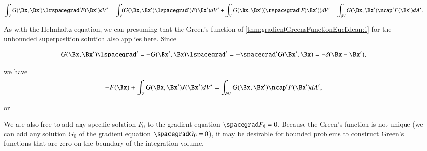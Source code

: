 \begin{dmath}\label{eqn:gradientGreensFunctionEuclidean:500}
\int_V G(\Bx, \Bx') \lrspacegrad' F(\Bx') dV'
=
\int_V (G(\Bx, \Bx') \lspacegrad') F(\Bx') dV'
+
\int_V G(\Bx, \Bx') (\rspacegrad' F(\Bx')) dV'
=
\int_{\partial V} G(\Bx, \Bx') \ncap' F(\Bx') dA'.
\end{dmath}

As with the Helmholtz equation, we can presuming that the Green's function of
\cref{thm:gradientGreensFunctionEuclidean:1}
for the unbounded superposition solution also applies here.  Since

\begin{dmath}\label{eqn:gradientGreensFunctionEuclidean:520}
G(\Bx, \Bx') \lspacegrad'
=
-G(\Bx', \Bx) \lspacegrad'
=
-
\spacegrad' G(\Bx', \Bx)
= -\delta(\Bx - \Bx'),
\end{dmath}

we have
\begin{dmath}\label{eqn:gradientGreensFunctionEuclidean:540}
-F(\Bx)
+
\int_V G(\Bx, \Bx') J(\Bx') dV'
=
\int_{\partial V} G(\Bx, \Bx') \ncap' F(\Bx') dA',
\end{dmath}

or

We are also free to add any specific solution \( F_0 \) to the gradient equation \( \spacegrad F_0 = 0 \).
Because the Green's function is not unique (we can add any solution \( G_0 \) of the gradient equation \( \spacegrad G_0 = 0 \)),
it may be desirable for bounded problems to construct Green's functions that are zero on the boundary of the integration volume.

